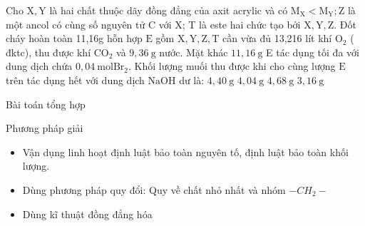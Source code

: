 \begin{vdex}
	Cho $\mathrm{X}, \mathrm{Y}$ là hai chất thuộc dãy đồng đẳng của axit acrylic và có $\mathrm{M}_{\mathrm{X}}<\mathrm{M}_{\mathrm{Y}} ; \mathrm{Z}$ là một ancol có cùng số nguyên tử $\mathrm{C}$ với $\mathrm{X}$; T là este hai chức tạo bởi $\mathrm{X}, \mathrm{Y}, \mathrm{Z}$. Đốt cháy hoàn toàn 11,16g hỗn hợp $\mathrm{E}$ gồm $\mathrm{X}, \mathrm{Y}, \mathrm{Z}, \mathrm{T}$ cần vừa đủ 13,216 lít khí $\mathrm{O}_2$ ( đktc), thu được khí $\mathrm{CO}_2$ và $9,36 \mathrm{~g}$ nước. Mặt khác $11,16 \mathrm{~g}$ E tác dụng tối đa với dung dịch chứa $0,04 \mathrm{~mol} \mathrm{Br}_2$. Khối lượng muối thu được khi cho cùng lượng $\mathrm{E}$ trên tác dụng hết với dung dịch $\mathrm{NaOH}$ dư là:
	\choice
	{%
		$4,40 \mathrm{~g}$
	}
	{%
	\True	$4,04 \mathrm{~g}$	
	}
	{%
		$4,68 \mathrm{~g}$	
	}
	{%
		$3,16 \mathrm{~g}$	
	}
	\huongdan
	{%
		
		
	}
\end{vdex}

\begin{dangntd}{Bài toán tổng hợp}
	\begin{ntdppg}{Phương pháp giải}
		\begin{itemize}
			\item Vận dụng linh hoạt định luật bảo toàn nguyên tố, định luật bảo toàn khối lượng.
			\item Dùng phương pháp quy đổi: Quy về chất nhỏ nhất và nhóm $ -CH_2- $
			\item Dùng kĩ thuật đồng đẳng hóa
		\end{itemize}
	\end{ntdppg}
\end{dangntd}


